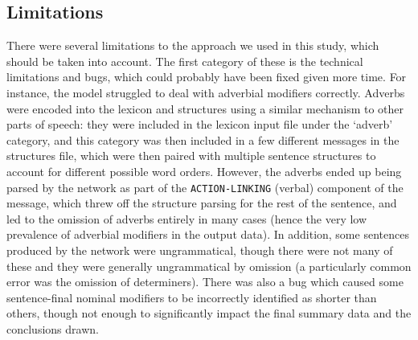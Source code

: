 \documentclass{article}
\begin{document}
\subsection{Limitations}
There were several limitations to the approach we used in this study, which should be taken into account. The first category of these is the technical limitations and bugs, which could probably have been fixed given more time. For instance, the model struggled to deal with adverbial modifiers correctly. Adverbs were encoded into the lexicon and structures using a similar mechanism to other parts of speech: they were included in the lexicon input file under the `adverb' category, and this category was then included in a few different messages in the structures file, which were then paired with multiple sentence structures to account for different possible word orders. However, the adverbs ended up being parsed by the network as part of the \texttt{ACTION-LINKING} (verbal) component of the message, which threw off the structure parsing for the rest of the sentence, and led to the omission of adverbs entirely in many cases (hence the very low prevalence of adverbial modifiers in the output data). In addition, some sentences produced by the network were ungrammatical, though there were not many of these and they were generally ungrammatical by omission (a particularly common error was the omission of determiners). There was also a bug which caused some sentence-final nominal modifiers to be incorrectly identified as shorter than others, though not enough to significantly impact the final summary data and the conclusions drawn.
\end{document}
